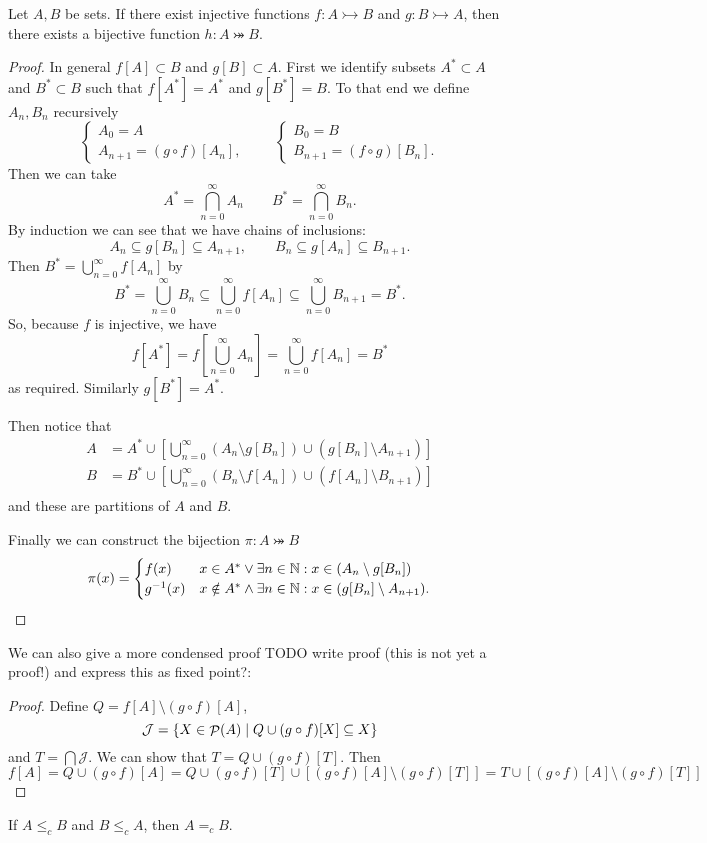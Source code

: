 \begin{theorem} \label{theorem:SchroederBernstein}
Let $A, B$ be sets. If there exist injective functions $f: A\rightarrowtail B$ and $g: B\rightarrowtail A$, then there exists a bijective function $h: A\twoheadrightarrowtail B$.
\end{theorem}
\begin{proof}
In general $f[A]\subset B$ and $g[B]\subset A$. First we identify subsets $A^*\subset A$ and $B^*\subset B$ such that $f[A^*] = A^*$ and $g[B^*] = B$. To that end we define $A_n,B_n$ recursively
\[ \begin{cases}
A_0 = A \\ A_{n+1} = (g\circ f)[A_n],
\end{cases} \qquad \begin{cases}
B_0 = B \\ B_{n+1} = (f\circ g)[B_n].
\end{cases} \]
Then we can take
\[ A^* = \bigcap_{n=0}^\infty A_n \qquad B^* = \bigcap_{n=0}^\infty B_n. \]
By induction we can see that we have chains of inclusions:
\[ A_n\subseteq g[B_n] \subseteq A_{n+1}, \qquad B_n\subseteq g[A_n] \subseteq B_{n+1}. \]
Then $B^* = \bigcup_{n=0}^\infty f[A_n]$ by
\[ B^* = \bigcup_{n=0}^\infty B_n \subseteq \bigcup_{n=0}^\infty f[A_n]\subseteq \bigcup_{n=0}^\infty B_{n+1} = B^{*}. \]
So, because $f$ is injective, we have
\[ f[A^*] = f[\bigcup_{n=0}^\infty A_n] = \bigcup_{n=0}^\infty f[A_n] = B^* \]
as required. Similarly $g[B^*] = A^*$.

Then notice that
\begin{align*}
A &= A^* \cup \left[ \bigcup_{n=0}^\infty (A_n\setminus g[B_n])\cup (g[B_n]\setminus A_{n+1}) \right] \\
B &= B^* \cup \left[ \bigcup_{n=0}^\infty (B_n\setminus f[A_n])\cup (f[A_n]\setminus B_{n+1}) \right] \\
\end{align*}
and these are partitions of $A$ and $B$.

Finally we can construct the bijection $\pi: A\twoheadrightarrowtail B$
\[ \pi(x) = \begin{cases}
f(x) & x\in A^* \lor \exists n\in \mathbb{N}: x\in (A_n\setminus g[B_n]) \\
g^{-1}(x) & x\notin A^* \land \exists n\in \mathbb{N}: x\in (g[B_n]\setminus A_{n+1}).
\end{cases} \]
\end{proof}
We can also give a more condensed proof TODO write proof (this is not yet a proof!) and express this as fixed point?:
\begin{proof}
Define $Q = f[A]\setminus (g\circ f)[A]$,
\[ \mathcal{J} = \{ X\in \mathop{\mathcal{P}}(A)\;|\; Q\cup (g\circ f)[X] \subseteq X \} \]
and $T = \bigcap \mathcal{J}$. We can show that $T = Q\cup (g\circ f)[T]$. Then
\[ f[A] = Q\cup (g\circ f)[A] = Q\cup (g\circ f)[T]\cup [(g\circ f)[A]\setminus (g\circ f)[T]] = T\cup [(g\circ f)[A]\setminus (g\circ f)[T]] \]
\end{proof}
\begin{corollary}
If $A\leq_c  B$ and $B\leq_c A$, then $A=_c B$.
\end{corollary}

